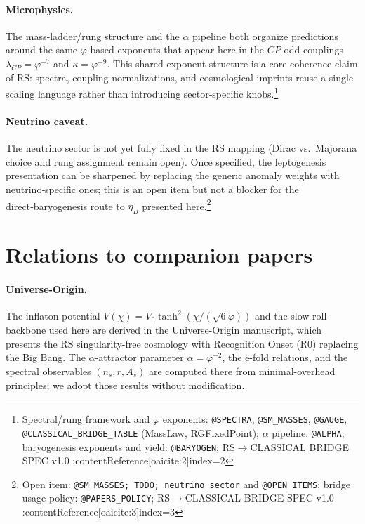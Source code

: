 \documentclass[11pt]{article}
\begin{document}
\paragraph{Microphysics.}
The mass‑ladder/rung structure and the \(\alpha\) pipeline both organize predictions around the same \(\varphi\)‑based exponents that appear here in the \(CP\)‑odd couplings \(\lambda_{CP}=\varphi^{-7}\) and \(\kappa=\varphi^{-9}\). This shared exponent structure is a core coherence claim of RS: spectra, coupling normalizations, and cosmological imprints reuse a single scaling language rather than introducing sector‑specific knobs.\footnote{Spectral/rung framework and \(\varphi\) exponents: \texttt{@SPECTRA}, \texttt{@SM\_MASSES}, \texttt{@GAUGE}, \texttt{@CLASSICAL\_BRIDGE\_TABLE} (MassLaw, RGFixedPoint); \(\alpha\) pipeline: \texttt{@ALPHA}; baryogenesis exponents and yield: \texttt{@BARYOGEN}; RS\(\to\)CLASSICAL BRIDGE SPEC v1.0 :contentReference[oaicite:2]{index=2}}

\paragraph{Neutrino caveat.}
The neutrino sector is not yet fully fixed in the RS mapping (Dirac vs.\ Majorana choice and rung assignment remain open). Once specified, the leptogenesis presentation can be sharpened by replacing the generic anomaly weights with neutrino‑specific ones; this is an open item but not a blocker for the direct‑baryogenesis route to \(\eta_B\) presented here.\footnote{Open item: \texttt{@SM\_MASSES; TODO; neutrino\_sector} and \texttt{@OPEN\_ITEMS}; bridge usage policy: \texttt{@PAPERS\_POLICY}; RS\(\to\)CLASSICAL BRIDGE SPEC v1.0 :contentReference[oaicite:3]{index=3}}

\section{Relations to companion papers}

\paragraph{Universe-Origin.}
The inflaton potential $V(\chi)=V_0\tanh^2(\chi/(\sqrt{6}\varphi))$ and the slow-roll backbone used here are derived in the Universe-Origin manuscript, which presents the RS singularity-free cosmology with Recognition Onset (R0) replacing the Big Bang. The $\alpha$-attractor parameter $\alpha=\varphi^{-2}$, the e-fold relations, and the spectral observables $(n_s, r, A_s)$ are computed there from minimal-overhead principles; we adopt those results without modification.
\end{document}
